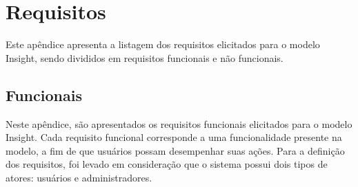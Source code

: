 \documentclass[twoside,english,brazilian]{UNISINOSartigo}
\begin{document}



 \appendix
 \section{Requisitos}\label{apendice:requisitos}
 Este apêndice apresenta a listagem dos requisitos elicitados para o modelo Insight, sendo divididos em requisitos funcionais e não funcionais.

 \subsection{Funcionais}
 Neste apêndice, são apresentados os requisitos funcionais elicitados para o modelo Insight. Cada requisito funcional corresponde a uma funcionalidade presente na modelo, a fim de que usuários possam desempenhar suas ações. Para a definição dos requisitos, foi levado em consideração que o sistema possui dois tipos de atores: usuários e administradores.
\end{document}
